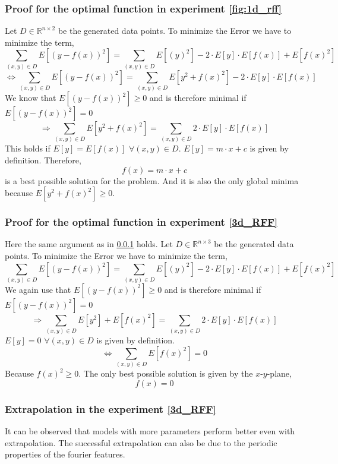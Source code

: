 \subsubsection{Proof for the optimal function in experiment \ref{fig:1d_rff}}
\label{proof_for_1d_rff}
Let $D \in \mathbb{R}^{n \times 2}$ be the generated data points. 
To minimize the Error we have to minimize the term,
$$
\sum_{(x,y) \in D} E[(y - f(x))^2] = \sum_{(x,y) \in D} E[(y)^2] - 2\cdot E[y]\cdot E[f(x)] +  E[f(x)^2]
$$
$$
\Longleftrightarrow \sum_{(x,y) \in D} E[(y - f(x))^2] = \sum_{(x,y) \in D} E[y^2 + f(x)^2] - 2\cdot E[y]\cdot E[f(x)] 
$$
We know that $E[(y - f(x))^2] \geq 0$ and is therefore minimal if $E[(y - f(x))^2] = 0$
$$
\Rightarrow \sum_{(x,y) \in D} E[y^2 + f(x)^2] = \sum_{(x,y) \in D} 2\cdot E[y]\cdot E[f(x)]  
$$
This holds if $E[y] = E[f(x)]$  $\forall (x,y) \in D$. $E[y] = m \cdot x + c$ is given by definition. Therefore,   
$$
f(x) = m\cdot x + c 
$$
is a best possible solution for the problem. And it is also the only global minima because $E[y^2 + f(x)^2] \geq 0$.


\subsubsection{Proof for the optimal function in experiment \ref{3d_RFF}}
Here the same argument as in \ref{proof_for_1d_rff} holds.
Let $D \in \mathbb{R}^{n \times 3}$ be the generated data points. 
To minimize the Error we have to minimize the term,
$$
\sum_{(x,y) \in D} E[(y - f(x))^2] = \sum_{(x,y) \in D} E[(y)^2] - 2\cdot E[y]\cdot E[f(x)] +  E[f(x)^2]
$$
We again use that $E[(y - f(x))^2] \geq 0$ and is therefore minimal if $E[(y - f(x))^2] = 0$
$$
\Rightarrow \sum_{(x,y) \in D} E[y^2] + E[f(x)^2] = \sum_{(x,y) \in D} 2\cdot E[y]\cdot E[f(x)]  
$$
$E[y] = 0$ $\forall (x,y) \in D$ is given by definition. 
$$
\Longleftrightarrow \sum_{(x,y) \in D} E[f(x)^2] = 0
$$
Because $f(x)^2 \geq 0$. The only best possible solution is given by the $x$-$y$-plane,
$$
f(x) = 0 
$$



\newpage

\subsubsection{Extrapolation in the experiment \ref{3d_RFF}}
\label{extrapolation}

It can be observed that models with more parameters perform better even with extrapolation. The successful extrapolation can also be due to the periodic properties of the fourier features.


